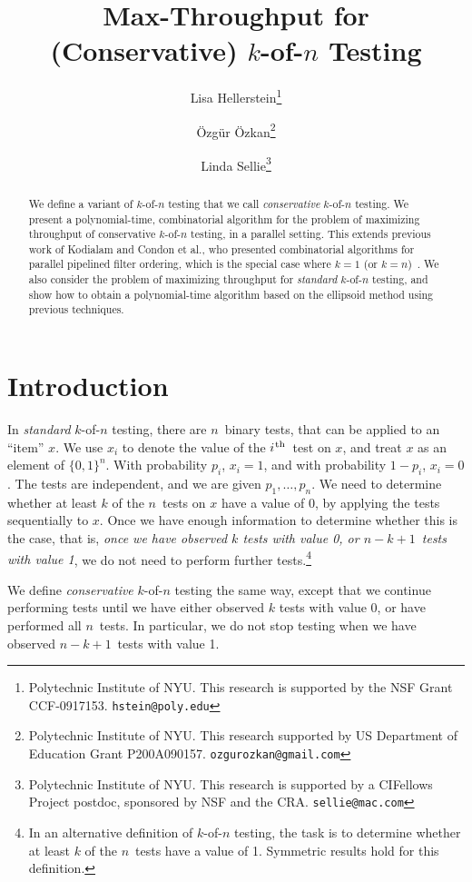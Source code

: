 \documentclass{article}
\title{Max-Throughput for (Conservative) $k$-of-$n$ Testing}
\author{Lisa Hellerstein\thanks{Polytechnic Institute of NYU. This research is supported by the NSF Grant CCF-0917153. {\tt hstein@poly.edu}}
 \and 
\"Ozg\"ur \"Ozkan\thanks{Polytechnic Institute of NYU. This research supported by US Department of Education Grant P200A090157. {\tt ozgurozkan@gmail.com}}
\and
Linda Sellie\thanks{Polytechnic Institute of NYU. This research is supported by a CIFellows Project postdoc, sponsored by NSF and the CRA. {\tt sellie@mac.com}}}
\newcommand{\ens}[1]{\ensuremath{#1}}					\newcommand{\card}[1]{\ens{|#1|}}							\newcommand{\dotlist}[2]{\ens{#1,\ldots,#2}}
\newcommand{\ith}{\ens{i^{\mbox{\hspace{.2mm}\scriptsize th}}}}
\newcommand{\anitem}{\ens{x}}
\newcommand{\valn}{\ens{n}}
\newcommand{\valk}{\ens{k}}
\newcommand{\valnmk}{\ens{\valn - \valk + 1}}
\newcommand{\kofn}{\valk-of-\valn}
\newcommand{\retval}[1]{\ens{\anitem_{#1}}}					\newcommand{\pr}[1]{\ens{p_{#1}}}									\newcommand{\qr}[1]{\ens{q_{#1}}}									\newcommand{\op}[1]{\ens{O_{#1}}}									\newcommand{\megaop}[1]{\ens{E_{#1}}}
\begin{document}
\maketitle


\begin{abstract}
We define a variant of \kofn{} testing
that we call {\em conservative} \kofn{} testing.
We present a polynomial-time, combinatorial algorithm for the
problem of maximizing throughput of
conservative \kofn{} testing, in
a parallel setting.  
This extends previous work of Kodialam and Condon et al., 
who presented combinatorial
algorithms for parallel pipelined filter ordering,
which is the special case where $\valk=1$ (or $\valk=\valn$)~\cite{conf/ipco/Kodialam01,conf/pods/CondonDHW06,journals/talg/CondonDHW09}.
We also consider the problem of maximizing throughput for 
{\em standard} \kofn{} testing, and show how to obtain a polynomial-time algorithm based on the ellipsoid method using previous techniques.
\end{abstract}






\section{Introduction}


In {\em standard} \kofn{} testing, there are \valn\ binary
tests, that can be applied to an ``item'' \anitem.  
We use \retval i to denote the value of the \ith\ test on \anitem, 
and treat \anitem{} as an
element of $\{0,1\}^{\valn}$.
With probability $\pr i$,
$\retval{i} =  1$,  and with probability $1-\pr i$,
$\retval{i} =  0$.
The tests are independent, and we are given
$\pr 1, \ldots, \pr{\valn}$.
We need to determine whether at least $\valk$ of the \valn\ tests on \anitem{}
have a value of 0, by applying the tests
sequentially to \anitem.
Once we have enough
information to determine whether this is the case, that is, {\em once
we have observed $\valk$ tests with value 0, or \valnmk\ tests with
value 1}, we do not need to perform further tests.\footnote{In an alternative definition of \kofn{} testing, the task is to determine whether at least $\valk$ of the \valn\ tests have a value of 1.  Symmetric results hold for this definition.}

We define {\em conservative} \kofn{} testing the same way,
except that we continue performing tests
until we have either observed $\valk$ tests with value 0,
or have performed all \valn\ tests.  In particular, we do not stop
testing when we have observed \valnmk\ tests with value 1.
\end{document}

